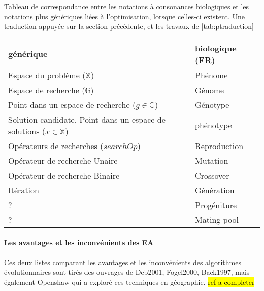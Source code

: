 \begin{table}[!htbp]
\begin{sidecaption}[fortoc]{Tableau de correspondance entre les notations à consonances biologiques et les notations plus génériques liées à l'optimisation, lorsque celles-ci existent. Une traduction appuyée sur la section précédente, et les travaux de \textcite{Weise2011}}
	[tab:ptraduction]
	\centering
	\begin{tabular}{ll}
		\toprule
		générique & biologique (FR)\\
		\midrule
		Espace du problème ($\mathbb{X}$) & Phénome \\
		Espace de recherche ($\mathbb{G}$)   &  Génome \\
		Point dans un espace de recherche ($g \in \mathbb{G}$) & Génotype \\
		Solution candidate, Point dans un espace de solutions ($x \in \mathbb{X}$) & phénotype \\
		Opérateurs de recherches ($searchOp$) & Reproduction \\
		Opérateur de recherche Unaire & Mutation \\
		Opérateur de recherche Binaire & Crossover \\
		Itération & Génération \\
		?  & Progéniture \\
		?  & Mating pool \\
		\bottomrule
	\end{tabular}
  \end{sidecaption}
\end{table}

\paragraph{Les avantages et les inconvénients des EA}

Ces deux listes comparant les avantages et les inconvénients des algorithmes évolutionnaires sont tirés des ouvrages de Deb2001, Fogel2000, Back1997, \autocite[104,105]{DeJong2006a} mais également Openshaw qui a exploré ces techniques en géographie. \hl{ref a completer}

